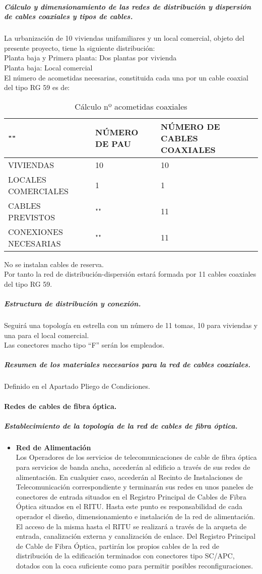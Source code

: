 \subparagraph{Cálculo y dimensionamiento de las redes de distribución y dispersión de cables coaxiales y tipos de cables.}
La urbanización de 10 viviendas unifamiliares y un local comercial, objeto del presente proyecto, tiene la siguiente distribución:\\
Planta baja y Primera planta:			Dos plantas por vivienda\\
Planta baja:							Local comercial\\
El número de acometidas necesarias, constituida cada una por un cable coaxial del tipo RG 59 es de:
\begin{table}[H]
\centering
\begin{tabular}{p{5cm} p{5cm} p{5cm}}
\hline
""&NÚMERO DE PAU&NÚMERO DE CABLES COAXIALES \\
\hline \hline
VIVIENDAS&10&10\\
\hline
LOCALES COMERCIALES&1&1\\
\hline
CABLES PREVISTOS&""&11\\
\hline
CONEXIONES NECESARIAS&""&11\\
\end{tabular}
\caption{Cálculo nº acometidas coaxiales}
\label{tabla:autores}
\end{table}
No se instalan cables de reserva.\\
Por tanto la red de distribución-dispersión estará formada por 11 cables coaxiales del tipo RG 59.
\subparagraph{Estructura de distribución y conexión.}
Seguirá una topología en estrella con un número de 11 tomas, 10 para viviendas y una para el local comercial.\\
Las conectores macho tipo “F” serán los empleados.
\subparagraph{Resumen de los materiales necesarios para la red de cables coaxiales.}
Definido en el Apartado Pliego de Condiciones.
\paragraph{Redes de cables de fibra óptica.}
\subparagraph{Establecimiento de la topología de la red de cables de fibra óptica.}
\begin{itemize}
	\item \textbf{Red de Alimentación}\\
	Los Operadores de los servicios de telecomunicaciones de cable de fibra óptica para servicios de
banda ancha, accederán al edificio a través de sus redes de alimentación. En cualquier caso,
accederán al Recinto de Instalaciones de Telecomunicación correspondiente y terminarán sus
redes en unos paneles de conectores de entrada situados en el Registro Principal de Cables de
Fibra Óptica situados en el RITU.
Hasta este punto es responsabilidad de cada operador el diseño, dimensionamiento e instalación
de la red de alimentación. El acceso de la misma hasta el RITU se realizará a través de la arqueta
de entrada, canalización externa y canalización de enlace.
Del Registro Principal de Cable de Fibra Óptica, partirán los propios cables de la red de
distribución de la edificación terminados con conectores tipo SC/APC, dotados con la coca
suficiente como para permitir posibles reconfiguraciones.
\end{itemize}

